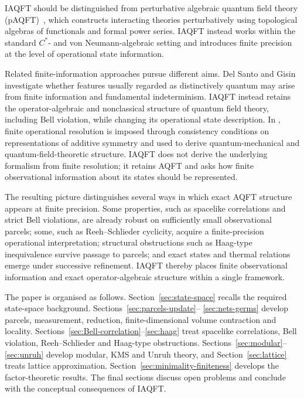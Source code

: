 \documentclass[11pt]{article}
\begin{document}
IAQFT should be distinguished from perturbative algebraic quantum field
theory (pAQFT)~\cite{Rejzner2016}, which constructs interacting theories
perturbatively using topological algebras of functionals and formal power
series. IAQFT instead works within the standard $C^*$- and von
Neumann-algebraic setting and introduces finite precision at the level of
operational state information.

Related finite-information approaches pursue different aims. Del Santo
and Gisin~\cite{DelSantoGisin2025} investigate whether features usually
regarded as distinctively quantum may arise from finite information and
fundamental indeterminism. IAQFT instead retains the operator-algebraic
and nonclassical structure of quantum field theory, including Bell
violation, while changing its operational state description. In
\cite{Treppiedi2026}, finite operational resolution is imposed through
consistency conditions on representations of additive symmetry and used
to derive quantum-mechanical and quantum-field-theoretic structure.
IAQFT does not derive the underlying formalism from finite resolution;
it retains AQFT and asks how finite observational information about its
states should be represented.

The resulting picture distinguishes several ways in which exact AQFT
structure appears at finite precision. Some properties, such as
spacelike correlations and strict Bell violations, are already robust on
sufficiently small observational parcels; some, such as
Reeh--Schlieder cyclicity, acquire a finite-precision operational
interpretation; structural obstructions such as Haag-type inequivalence
survive passage to parcels; and exact states and thermal relations emerge
under successive refinement. IAQFT thereby places finite observational
information and exact operator-algebraic structure within a single
framework.

The paper is organised as follows. Section~\ref{sec:state-space} recalls
the required state-space background. Sections~\ref{sec:parcels-update}--
\ref{sec:nets-germs} develop parcels, measurement, reduction,
finite-dimensional volume contraction and locality.
Sections~\ref{sec:Bell-correlation}--\ref{sec:haag} treat spacelike
correlations, Bell violation, Reeh--Schlieder and Haag-type obstructions.
Sections~\ref{sec:modular}--\ref{sec:unruh} develop modular, KMS and
Unruh theory, and Section~\ref{sec:lattice} treats lattice approximation.
Section~\ref{sec:minimality-finiteness} develops the factor-theoretic
results. The final sections discuss open problems and conclude with the
conceptual consequences of IAQFT.
\end{document}
